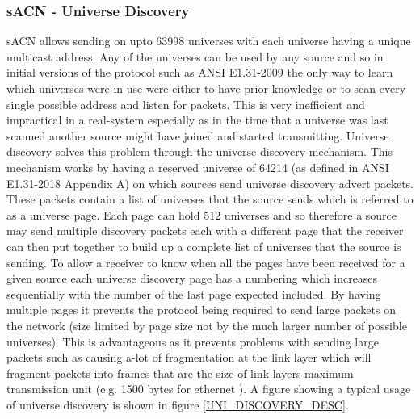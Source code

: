 \documentclass[11pt,a4paper]{article}
\begin{document}
\subsubsection{sACN - Universe Discovery}
sACN allows sending on upto 63998 universes with each universe having a unique multicast address. Any of the universes can be used by any source and so in initial versions of the protocol such as ANSI E1.31-2009 \cite{ANSI_E1.31_2009} the only way to learn which universes were in use were either to have prior knowledge or to scan every single possible address and listen for packets. This is very inefficient and impractical in a real-system especially as in the time that a universe was last scanned another source might have joined and started transmitting. Universe discovery solves this problem through the universe discovery mechanism. This mechanism works by having a reserved universe of 64214 (as defined in ANSI E1.31-2018 Appendix A) on which sources send universe discovery advert packets. These packets contain a list of universes that the source sends which is referred to as a universe page. Each page can hold 512 universes and so therefore a source may send multiple discovery packets each with a different page that the receiver can then put together to build up a complete list of universes that the source is sending. To allow a receiver to know when all the pages have been received for a given source each universe discovery page has a numbering which increases sequentially with the number of the last page expected included. By having multiple pages it prevents the protocol being required to send large packets on the network (size limited by page size not by the much larger number of possible universes). This is advantageous as it prevents problems with sending large packets such as causing a-lot of fragmentation at the link layer which will fragment packets into frames that are the size of link-layers maximum transmission unit (e.g. 1500 bytes for ethernet \cite{ETHERNET_MTU}). A figure showing a typical usage of universe discovery is shown in figure \ref{UNI_DISCOVERY_DESC}. 
\end{document}
